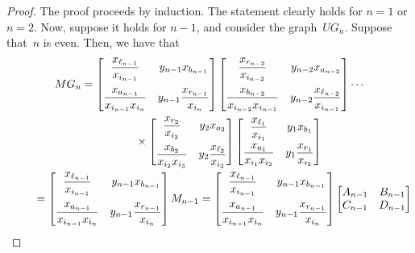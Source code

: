\begin{proof} The proof proceeds by induction. The statement clearly holds for $n = 1$ or $n = 2$. Now, suppose it holds for $n-1$, and consider the graph~$UG_n$. Suppose that~$n$ is even. Then, we have that
\begin{gather*}
MG_n = \begin{bmatrix}\dfrac{x_{\ell_{n-1}}}{x_{i_{n-1}}} & y_{n-1} x_{b_{n-1}} \vspace{2mm}\\ \dfrac{x_{a_{n-1}}}{x_{i_{n-1}}x_{i_n}} & y_{n-1} \dfrac{x_{r_{n-1}}}{x_{i_n}} \end{bmatrix} \begin{bmatrix} \dfrac{x_{r_{n-2}}}{x_{i_{n-2}}} & y_{n-2} x_{a_{n-2}} \vspace{2mm}\\ \dfrac{x_{b_{n-2}}}{x_{i_{n-2}}x_{i_{n-1}}} & y_{n-2} \dfrac{x_{\ell_{n-2}}}{x_{i_{n-1}}} \end{bmatrix} \cdots\\
\hphantom{MG_n=}{}\times
 \begin{bmatrix}\dfrac{x_{r_2}}{x_{i_2}} & y_2 x_{a_2} \vspace{2mm}\\ \dfrac{x_{b_2}}{x_{i_2}x_{i_3}} & y_2 \dfrac{x_{\ell_2}}{x_{i_3}} \end{bmatrix} \begin{bmatrix} \dfrac{x_{\ell_1}}{x_{i_1}} & y_1 x_{b_1} \vspace{1mm}\\ \dfrac{x_{a_1}}{x_{i_1}x_{i_2}} & y_1 \dfrac{x_{r_1}}{x_{i_2}} \end{bmatrix}
\\
\hphantom{MG_n}{}
= \begin{bmatrix}\dfrac{x_{\ell_{n-1}}}{x_{i_{n-1}}} & y_{n-1} x_{b_{n-1}} \vspace{2mm}\\ \dfrac{x_{a_{n-1}}}{x_{i_{n-1}}x_{i_n}} & y_{n-1} \dfrac{x_{r_{n-1}}}{x_{i_n}} \end{bmatrix} M_{n-1} = \begin{bmatrix}\dfrac{x_{\ell_{n-1}}}{x_{i_{n-1}}} & y_{n-1} x_{b_{n-1}} \vspace{2mm} \\ \dfrac{x_{a_{n-1}}}{x_{i_{n-1}}x_{i_n}} & y_{n-1} \dfrac{x_{r_{n-1}}}{x_{i_n}} \end{bmatrix} \begin{bmatrix} A_{n-1} & B_{n-1} \\ C_{n-1} & D_{n-1} \end{bmatrix}

\end{gather*}
\end{proof}

